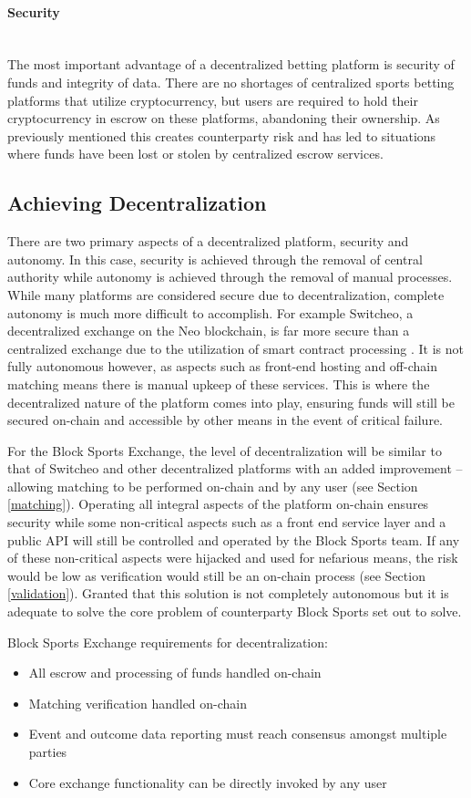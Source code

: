 \documentclass{article}
\newcommand{\myparagraph}[1]{\paragraph{#1}\mbox{}\\ \newline}
\begin{document}
				\myparagraph{Security} \label{security}
The most important advantage of a decentralized betting platform is security of funds and integrity of data. There are no shortages of centralized sports betting platforms that utilize cryptocurrency, but users are required to hold their cryptocurrency in escrow on these platforms, abandoning their ownership. As previously mentioned this creates counterparty risk and has led to situations where funds have been lost or stolen by centralized escrow services.

	\clearpage
	\subsection{Achieving Decentralization} \label{achieving-decentralization}
There are two primary aspects of a decentralized platform, security and autonomy. In this case, security is achieved through the removal of central authority while autonomy is achieved through the removal of manual processes. While many platforms are considered secure due to decentralization, complete autonomy is much more difficult to accomplish. For example Switcheo, a decentralized exchange on the Neo blockchain, is far more secure than a centralized exchange due to the utilization of smart contract processing \cite{switcheo}. It is not fully autonomous however, as aspects such as front-end hosting and off-chain matching means there is manual upkeep of these services. This is where the decentralized nature of the platform comes into play, ensuring funds will still be secured on-chain and accessible by other means in the event of critical failure.

For the Block Sports Exchange, the level of decentralization will be similar to that of Switcheo and other decentralized platforms with an added improvement -- allowing matching to be performed on-chain and by any user (see Section \ref{matching}). Operating all integral aspects of the platform on-chain ensures security while some non-critical aspects such as a front end service layer and a public API will still be controlled and operated by the Block Sports team. If any of these non-critical aspects were hijacked and used for nefarious means, the risk would be low as verification would still be an on-chain process (see Section \ref{validation}). Granted that this solution is not completely autonomous but it is adequate to solve the core problem of counterparty Block Sports set out to solve.

Block Sports Exchange requirements for decentralization:
\begin{itemize}
	\item All escrow and processing of funds handled on-chain
	\item Matching verification handled on-chain
	\item Event and outcome data reporting must reach consensus amongst multiple parties 
	\item Core exchange functionality can be directly invoked by any user
\end{itemize}
\end{document}
